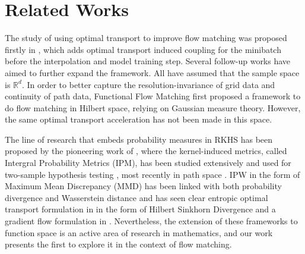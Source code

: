 \section{Related Works}

The study of using optimal transport \cite{Villani2008OptimalTO} to improve flow matching was proposed firstly in \cite{tong2024improvinggeneralizingflowbasedgenerative, pooladian2023multisampleflowmatchingstraightening}, which adds optimal transport induced coupling for the minibatch before the interpolation and model training step. Several follow-up works \cite{kornilov2024optimalflowmatchinglearning, yue2025oatfmoptimalaccelerationtransport} have aimed to further expand the framework. All have assumed that the sample space is $\mathbb{R}^d$. In order to better capture the resolution-invariance of grid data and continuity of path data, Functional Flow Matching \cite{kerrigan2023functionalflowmatching} first proposed a framework to do flow matching in Hilbert space, relying on Gaussian measure theory. However, the same optimal transport acceleration has not been made in this space.

The line of research that embeds probability measures in RKHS has been proposed by the pioneering work of \cite{Sriperumbudur2010Hilbert, gretton2008kernelmethodtwosampleproblem}, where the kernel-induced metrics, called Intergral Probability Metrics (IPM), has been studied extensively \cite{Dudley_2002, Sriperumbudur2010Hilbert} and used for two-sample  hypothesis testing \cite{gretton2008kernelmethodtwosampleproblem}, most recently in path space \cite{chevyrev2022signaturemoments}. IPW in the form of Maximum Mean Discrepancy (MMD) has been linked with both probability divergence and Wasserstein distance \cite{feydy19a-pmlr} and has seen clear entropic optimal transport formulation in \cite{Li_2021_CVPR} in the form of Hilbert Sinkhorn Divergence and a gradient flow formulation in \cite{galashov2024deepmmdgradientflow, arbel2019maximummeandiscrepancygradient}. Nevertheless, the extension of these frameworks to function space is an active area of research in mathematics, and our work presents the first to explore it in the context of flow matching. 